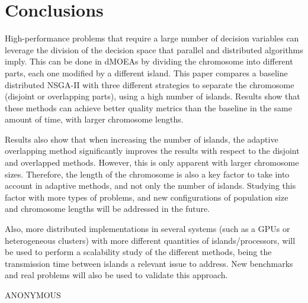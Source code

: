 \documentclass[Crown,sagev,times,doublespace]{sagej}
\begin{document}
\section{Conclusions}

High-performance problems that require a large number of decision variables can leverage the division of the decision space that parallel and distributed algorithms imply. This can be done in dMOEAs by dividing the chromosome into different parts, each one modified by a different island. This paper compares a baseline distributed NSGA-II with three different strategies to separate the chromosome (disjoint or overlapping parts), using a high number of islands. Results show that these methods can achieve better quality metrics than the baseline in the same amount of time, with larger chromosome lengths.

Results also show that when increasing the number of islands, the adaptive overlapping method significantly improves the results with respect to the disjoint and overlapped methods. However, this is only apparent with larger chromosome sizes. Therefore, the length of the chromosome is also a key factor to take into account in adaptive methods, and not only the number of islands. Studying this factor with more types of problems, and new configurations of population size and chromosome lengths will be addressed in the future.%
%

Also, more distributed implementations in several systems (such as a GPUs or heterogeneous clusters) with more different quantities of islands/processors, will be used to perform a scalability study of the different methods, being the transmission time between islands a relevant issue to address. New benchmarks and real problems will also be  used to validate this approach. 



\begin{acks}
ANONYMOUS
\end{acks}









\end{document}
